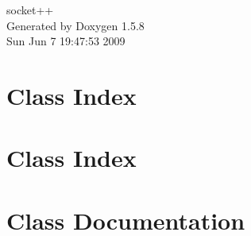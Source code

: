 \documentclass[a4paper]{book}
\begin{document}
\begin{titlepage}
\vspace*{7cm}
\begin{center}
{\Large socket++ }\\
\vspace*{1cm}
{\large Generated by Doxygen 1.5.8}\\
\vspace*{0.5cm}
{\small Sun Jun 7 19:47:53 2009}\\
\end{center}
\end{titlepage}
\clearemptydoublepage
{}
\tableofcontents
\clearemptydoublepage
{}
\chapter{Class Index}

\chapter{Class Index}

\chapter{Class Documentation}






















\printindex
\end{document}
